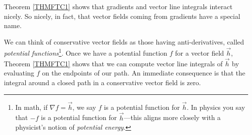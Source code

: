 Theorem \ref{THMFTC1} shows that gradients and vector line integrals
interact nicely.  So nicely, in fact, that vector fields coming 
from gradients have a special name.

\DefConservative

We can think of conservative vector fields
as those having anti-derivatives,
called \emph{potential functions}\footnote{
In math, if $\nabla f=\vec h$, we say $f$ is a potential function for $\vec h$.
In physics you say that $-f$ is a potential function for $\vec h$---this aligns
more closely with a physicist's notion of \emph{potential energy}.}.  Once
we have a potential function $f$ for a vector field $\vec h$, 
Theorem \ref{THMFTC1} shows that we can compute vector line integrals
of $\vec h$ by evaluating $f$ on the endpoints of our path.  An immediate consequence
is that the integral around a closed path in a conservative vector field is
zero.

